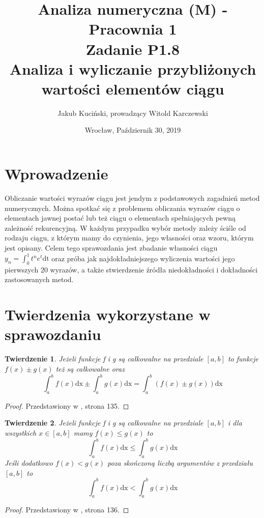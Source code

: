 \documentclass[11pt,wide]{article}
\title{Analiza numeryczna (M) - Pracownia 1 \\ Zadanie P1.8\\
Analiza i wyliczanie przybliżonych wartości elementów ciągu}
\date{Wrocław, Październik 30, 2019}
\author{Jakub Kuciński, prowadzący Witold Karczewski}
\newtheorem{thm}{Twierdzenie}
\begin{document}
\maketitle
\thispagestyle{empty} 
\tableofcontents

\section{Wprowadzenie}
Obliczanie wartości wyrazów ciągu jest jendym z podstawowych zagadnień metod numerycznych. Można spotkać się z problemem obliczania wyrazów ciągu o elementach jawnej postać lub też ciągu o elementach spełniających pewną zależność rekurencyjną. W każdym przypadku wybór metody zależy ściśle od rodzaju ciągu, z którym mamy do czynienia, jego własności oraz wzoru, którym jest opisany. Celem tego sprawozdania jest zbadanie własności ciągu \(\displaystyle y_n = \int_0^1 t^n e^t \mathrm{dt}\) oraz próba jak najdokładniejszego wyliczenia wartości jego pierwszych 20 wyrazów, a także stwierdzenie źródła niedokładności i dokładności zastosowanych metod.
\section{Twierdzenia wykorzystane w sprawozdaniu}
\begin{thm} \label{tw:sumacalek}
Jeżeli funkcje f i g są całkowalne na przedziale \([a,b]\) to funkcje \(f(x) \pm g(x)\) też są całkowalne oraz
\begin{equation} 
\int_a^b f(x)\mathrm{dx} \pm \int_a^b g(x)\mathrm{dx} = \int_a^b (f(x) \pm g(x))\mathrm{dx}
\end{equation}
\end{thm}
\begin{proof}
Przedstawiony w \cite{Paluszynski}, strona 135.
\end{proof}

\begin{thm} \label{tw:greeq}
Jeżeli funkcje f i g są całkowalne na przedziale \([a,b]\) i dla wszystkich \(x \in [a,b]\) mamy \(f(x) \leq g(x)\) to
\begin{equation} 
 \int_a^b f(x)\mathrm{dx} \leq \int_a^b g(x)\mathrm{dx}
\end{equation}
Jeśli dodatkowo  \(f(x) < g(x)\) poza skończoną liczbą argumentów z przedziału \([a,b]\) to 
\begin{equation} 
\int_a^b f(x)\mathrm{dx} < \int_a^b g(x)\mathrm{dx}
\end{equation}
\end{thm}
\begin{proof}
Przedstawiony w \cite{Paluszynski}, strona 136.
\end{proof}
\end{document}
